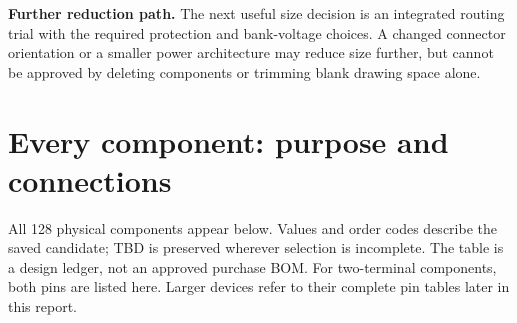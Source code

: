 \documentclass[11pt,a4paper]{article}
\begin{document}
\textbf{Further reduction path.} The next useful size decision is an integrated routing trial with the required protection and bank-voltage choices. A changed connector orientation or a smaller power architecture may reduce size further, but cannot be approved by deleting components or trimming blank drawing space alone.
\clearpage\appendix
\section{Every component: purpose and connections}
All 128 physical components appear below. Values and order codes describe the saved candidate; TBD is preserved wherever selection is incomplete. The table is a design ledger, not an approved purchase BOM. For two-terminal components, both pins are listed here. Larger devices refer to their complete pin tables later in this report.
\end{document}
